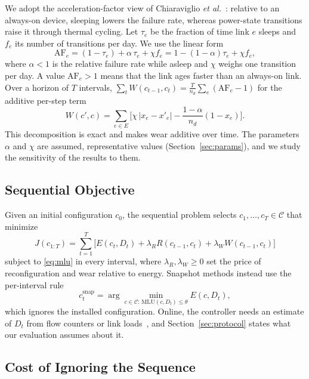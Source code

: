 \documentclass[preprint,12pt]{elsarticle}
\begin{document}
We adopt the acceleration-factor view of Chiaraviglio \emph{et al.}~\cite{chiaraviglio2015lifetime}: relative to an always-on device, sleeping lowers the failure rate, whereas power-state transitions raise it through thermal cycling. Let $\tau_e$ be the fraction of time link $e$ sleeps and $f_e$ its number of transitions per day. We use the linear form
\begin{equation}\label{eq:af}
\mathrm{AF}_e=(1-\tau_e)+\alpha\,\tau_e+\chi f_e=1-(1-\alpha)\tau_e+\chi f_e,
\end{equation}
where $\alpha<1$ is the relative failure rate while asleep and $\chi$ weighs one transition per day. A value $\mathrm{AF}_e>1$ means that the link ages faster than an always-on link. Over a horizon of $T$ intervals, $\sum_{t}W(c_{t-1},c_t)=\frac{T}{n_d}\sum_e(\mathrm{AF}_e-1)$ for the additive per-step term
\begin{equation}\label{eq:wear}
W(c',c)=\sum_{e\in E}\Big[\chi\,|x_e-x'_e|-\frac{1-\alpha}{n_d}(1-x_e)\Big].
\end{equation}
This decomposition is exact and makes wear additive over time. The parameters $\alpha$ and $\chi$ are assumed, representative values (Section~\ref{sec:params}), and we study the sensitivity of the results to them.

\subsection{Sequential Objective}

Given an initial configuration $c_0$, the sequential problem selects $c_1,\dots,c_T\in\mathcal{C}$ that minimize
\begin{equation}\label{eq:objective}
J(c_{1:T})=\sum_{t=1}^{T}\Big[E(c_t,D_t)+\lambda_R R(c_{t-1},c_t)+\lambda_W W(c_{t-1},c_t)\Big]
\end{equation}
subject to \eqref{eq:mlu} in every interval, where $\lambda_R,\lambda_W\ge0$ set the price of reconfiguration and wear relative to energy. Snapshot methods instead use the per-interval rule
\begin{equation}\label{eq:snapshot}
c^{\mathrm{snap}}_t=\arg\min_{c\in\mathcal{C}:\,\mathrm{MLU}(c,D_t)\le\theta}E(c,D_t),
\end{equation}
which ignores the installed configuration. Online, the controller needs an estimate of $D_t$ from flow counters or link loads~\cite{zhang2003tomogravity}, and Section~\ref{sec:protocol} states what our evaluation assumes about it.

\subsection{Cost of Ignoring the Sequence}
\end{document}
